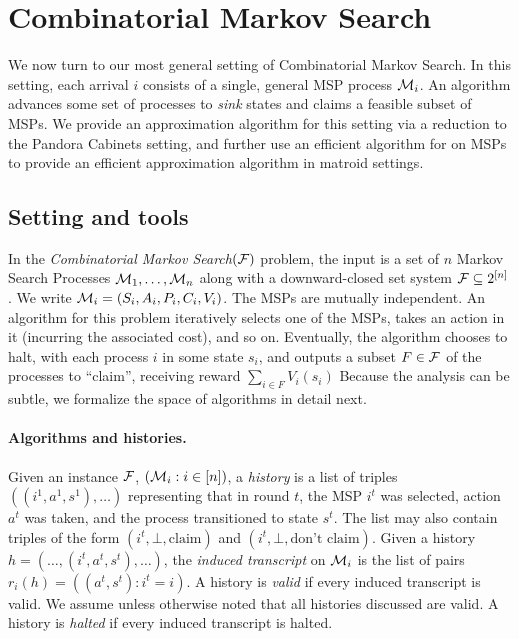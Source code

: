 \section{Combinatorial Markov Search} \label{sec:dags}

We now turn to our most general setting of Combinatorial Markov Search.
In this setting, each arrival $i$ consists of a single, general MSP process $\mathcal{M}_i$.
An algorithm advances some set of processes to \emph{sink} states and claims a feasible subset of MSPs.
We provide an approximation algorithm for this setting via a reduction to the Pandora Cabinets setting, and further use an efficient algorithm for \SAUP{} on MSPs to provide an efficient approximation algorithm in matroid settings.

\subsection{Setting and tools}

In the \emph{Combinatorial Markov Search$(\mathcal{F})$} problem, the input is a set of $n$ Markov Search Processes $\mathcal{M}_1,\dots,\mathcal{M}_n$ along with a downward-closed set system $\mathcal{F} \subseteq 2^{[n]}$.
We write $\mathcal{M}_i = (S_i,A_i,P_i,C_i,V_i)$.
The MSPs are mutually independent.
An algorithm for this problem iteratively selects one of the MSPs, takes an action in it (incurring the associated cost), and so on.
Eventually, the algorithm chooses to halt, with each process $i$ in some state $s_i$, and outputs a subset $F \in \mathcal{F}$ of the processes to ``claim'', receiving reward $\sum_{i \in F} V_i(s_i)$
Because the analysis can be subtle, we formalize the space of algorithms in detail next.


\paragraph{Algorithms and histories.}
Given an instance $\mathcal{F}$, $(\mathcal{M}_i : i \in [n])$, a \emph{history} is a list of triples $((i^1,a^1,s^1),\dots)$ representing that in round $t$, the MSP $i^t$ was selected, action $a^t$ was taken, and the process transitioned to state $s^t$.
The list may also contain triples of the form $(i^t,\bot,\text{claim})$ and $(i^t,\bot,\text{don't claim})$.
Given a history $h = (\dots,(i^t,a^t,s^t),\dots)$, the \emph{induced transcript} on $\mathcal{M}_i$ is the list of pairs $r_i(h) = ((a^t,s^t) : i^t = i)$.
A history is \emph{valid} if every induced transcript is valid.
We assume unless otherwise noted that all histories discussed are valid.
A history is \emph{halted} if every induced transcript is halted.

